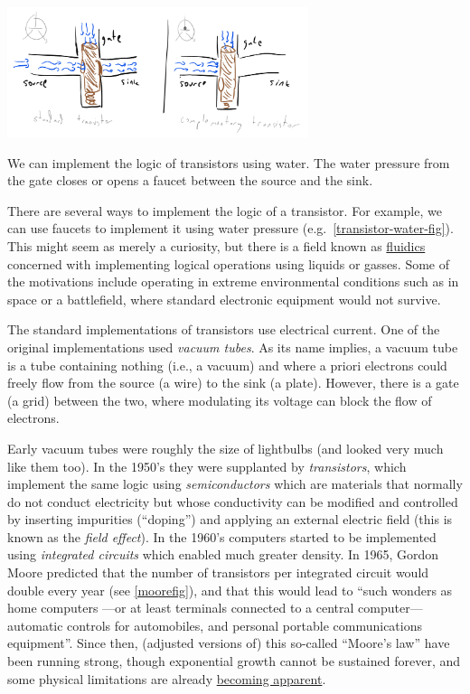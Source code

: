 \begin{marginfigure}
\centering
\includegraphics[width=\linewidth, height=1.5in, keepaspectratio]{../figure/transistor_water.png}
\caption{We can implement the logic of transistors using water. The
water pressure from the gate closes or opens a faucet between the source
and the sink.}
\label{transistor-water-fig}
\end{marginfigure}

There are several ways to implement the logic of a transistor. For
example, we can use faucets to implement it using water pressure
(e.g.~\cref{transistor-water-fig}). This might seem as merely a
curiosity, but there is a field known as
\href{https://en.wikipedia.org/wiki/Fluidics}{fluidics} concerned with
implementing logical operations using liquids or gasses. Some of the
motivations include operating in extreme environmental conditions such
as in space or a battlefield, where standard electronic equipment would
not survive.

The standard implementations of transistors use electrical current. One
of the original implementations used \emph{vacuum tubes}. As its name
implies, a vacuum tube is a tube containing nothing (i.e., a vacuum) and
where a priori electrons could freely flow from the source (a wire) to
the sink (a plate). However, there is a gate (a grid) between the two,
where modulating its voltage can block the flow of electrons.

Early vacuum tubes were roughly the size of lightbulbs (and looked very
much like them too). In the 1950's they were supplanted by
\emph{transistors}, which implement the same logic using
\emph{semiconductors} which are materials that normally do not conduct
electricity but whose conductivity can be modified and controlled by
inserting impurities (``doping'') and applying an external electric
field (this is known as the \emph{field effect}). In the 1960's
computers started to be implemented using \emph{integrated circuits}
which enabled much greater density. In 1965, Gordon Moore predicted that
the number of transistors per integrated circuit would double every year
(see \cref{moorefig}), and that this would lead to ``such wonders as
home computers ---or at least terminals connected to a central
computer--- automatic controls for automobiles, and personal portable
communications equipment''. Since then, (adjusted versions of) this
so-called ``Moore's law'' have been running strong, though exponential
growth cannot be sustained forever, and some physical limitations are
already
\href{http://www.nature.com/news/the-chips-are-down-for-moore-s-law-1.19338}{becoming
apparent}.


